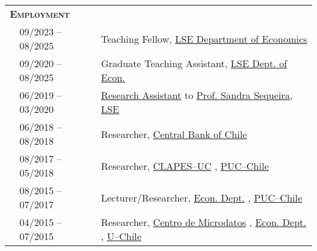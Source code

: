 \begin{tabular}{lll}
	
	\multicolumn{2}{l}{
		\large
		\textbf{%
			\textsc{%
				Employment
			}
		}
	}
	\\[2ex]
	
	  \indent
	& 09/2023 -- 08/2025
	& Teaching Fellow,
	\href{%
			https://www.lse.ac.uk/economics%
		}
		{LSE Department of Economics}
	\\
	
	& 09/2020 -- 08/2025
	& Graduate Teaching Assistant,
	\href{%
			https://www.lse.ac.uk/economics%
		}
		{LSE Dept. of Econ.}
	\\
	
	& 06/2019 -- 03/2020
	& 
		\href{%
			https://drive.google.com/file/d/1Nn5BeHOv2M4HhVNwtuzPtTAY8rVanidg/view%
		}
		{Research Assistant}
		to
		\href{%
			https://sites.google.com/view/sandramgsequeira/home%
		}
		{Prof. Sandra Sequeira},
		\href{%
			https://www.lse.ac.uk/%
		}
		{LSE}
	\\
	
	& 06/2018 -- 08/2018
	& Researcher,
		\href{%
			https://www.bcentral.cl/en/home%
		}
		{Central Bank of Chile}
	\\
	
	& 08/2017 -- 05/2018
	& Researcher,
		\href{%
			https://clapesuc.cl/%
		}
		{CLAPES--UC}%
		,
		\href{%
			https://www.uc.cl/en%
		}
		{PUC--Chile}
	\\
	
	& 08/2015 -- 07/2017
	& Lecturer/Researcher,
		\href{%
			https://economia.uc.cl/%
		}
		{Econ. Dept.}%
		,
		\href{%
			https://www.uc.cl/en%
		}
		{PUC--Chile}
	\\
	
	& 04/2015 -- 07/2015
	& Researcher,
		\href{%
			http://www.microdatos.cl/%
		}
		{Centro de Microdatos}%
		,
		\href{%
			https://econ.uchile.cl%
		}
		{Econ. Dept.}%
		,
		\href{%
			https://uchile.cl/english%
		}
		{U--Chile}
	\\
	
\end{tabular}